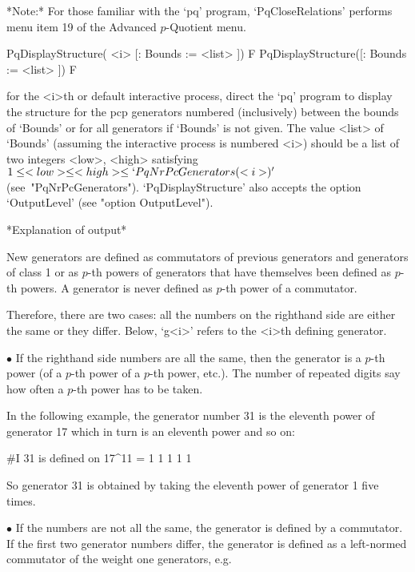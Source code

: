 *Note:* 
For those familiar with  the  `pq'  program,  `PqCloseRelations'  performs
menu item 19 of the Advanced $p$-Quotient menu.

\>PqDisplayStructure( <i> [: Bounds := <list> ]) F
\>PqDisplayStructure([: Bounds := <list> ]) F

for the <i>th or default interactive {\ANUPQ} process,  direct  the  `pq'
program  to  display  the  structure  for  the  pcp  generators   numbered
(inclusively) between the bounds of `Bounds' or  for  all  generators  if
`Bounds' is not  given.  The  value  <list>  of  `Bounds'  (assuming  the
interactive process is numbered <i>) should be a  list  of  two  integers
<low>,   <high>   satisfying   $1    \le    <low>    \le    <high>    \le
`PqNrPcGenerators(<i>)'$  (see~"PqNrPcGenerators").  `PqDisplayStructure'
also accepts the option `OutputLevel' (see "option OutputLevel").

*Explanation of output*

New  generators are  defined as  commutators of  previous  generators and
generators  of  class 1  or  as $p$-th  powers  of  generators that  have
themselves been defined as $p$-th powers. A generator is never defined as
$p$-th power of a commutator.

Therefore, there are two cases: all the numbers on the righthand side are
either the same or  they  differ.  Below,  `g<i>'  refers  to  the  <i>th
defining generator.

\beginlist%

\item{$\bullet$}
If the righthand side numbers are all the same, then the generator  is  a
$p$-th power (of a $p$-th power of a $p$-th power, etc.). The  number  of
repeated digits say how often a $p$-th power has to be taken.

In the following example, the generator number 31 is the  eleventh  power
of generator 17 which in turn is an eleventh power and so on:

\begintt
#I  31 is defined on 17^11 = 1 1 1 1 1 
\endtt
                    
So generator 31 is obtained by taking the eleventh power of  generator  1
five times.

\item{$\bullet$}
If the numbers are not all the same, the generator is defined by a
commutator.   If the first two generator numbers differ, the generator is
defined as a left-normed commutator of the weight one generators, e.g.

